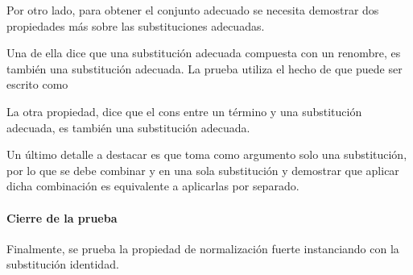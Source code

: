 \documentclass[]{report}
\begin{document}
	
	Por otro lado, para obtener el conjunto adecuado
	\AgdaSpace{}%
	\AgdaSpace{}%
	\AgdaSpace{}%
	\AgdaSpace{}%
	se necesita demostrar dos propiedades más sobre las substituciones adecuadas.
	
	Una de ella dice que una substitución adecuada compuesta con un renombre, es también una substitución adecuada.
	La prueba utiliza el hecho de que \AgdaSpace{} puede ser escrito como
	\AgdaSpace{}%
	\AgdaSpace{}%
	\AgdaSpace{}%
	\AgdaSpace{}%
	\AgdaSpace{}%
	
	
	La otra propiedad, dice que el cons entre un término \snstar y una substitución adecuada, es también una substitución adecuada.
	
	
	Un último detalle a destacar es que  toma como argumento solo una substitución, por lo que se debe combinar \AgdaBound{$\sigma$} y
	\AgdaSpace{}%
	\AgdaSpace{}%
	\AgdaSymbol{(}\AgdaSpace{}%
	\AgdaSpace{}%
	\AgdaSymbol{)}
	en una sola substitución y demostrar que aplicar dicha combinación es equivalente a aplicarlas por separado.

	
	
	\begin{samepage}
	\end{samepage}
	
	
	\paragraph{Cierre de la prueba}
	
	Finalmente, se prueba la propiedad de normalización fuerte instanciando  con la substitución identidad.
	
\end{document}
